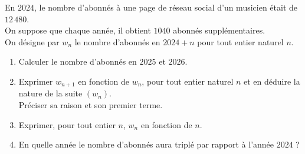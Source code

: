 \documentclass[11pt]{article}
\begin{document}
\begin{exercicedevoir}[6]
En $2024$, le nombre d'abonnés à une page de réseau social d'un musicien était de $12\,480$.\\
On suppose que chaque année, il obtient $1040$ abonnés supplémentaires.\\
On désigne par $w_n$ le nombre d'abonnés en $2024 + n$ pour tout
entier naturel $n$.\\
\begin{enumerate}
\item Calculer le nombre d'abonnés en $2025$ et $2026$.
\item Exprimer $w_{n+1}$ en fonction de $w_n$, pour tout entier naturel $n$ et en déduire la nature de
la suite $(w_n)$. \\
Préciser sa raison et son premier terme.
\item Exprimer, pour tout entier $n$, $w_n$ en fonction de $n$.
\item En quelle année le nombre d'abonnés aura triplé par rapport à l'année $2024$ ?
\end{enumerate}
\end{exercicedevoir}

\nonewpage
\end{document}
